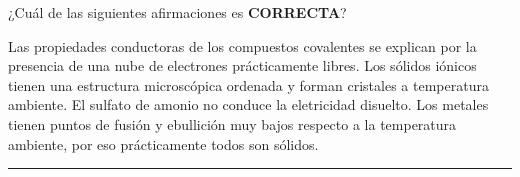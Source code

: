 \documentclass[a4paper,addpoints,14pt]{exam}
\newcommand*\chem[1]{\ensuremath{\mathrm{#1}}}
\newcommand{\halmos}{\vspace*{-4mm}
	
					\begin{flushright}
						\rule{1mm}{2.5mm} 
					\end{flushright}\vspace*{-4mm}
						
					  }
\renewcommand{\qed}{\halmos}
\begin{document}
	\begin{questions}
	
%			
		
	
	\begin{question}[1] ¿Cuál de las siguientes afirmaciones es \textbf{\small{CORRECTA}}?
		\begin{checkboxes}
			\choice Las propiedades conductoras de los compuestos covalentes se explican por la presencia de una nube de electrones prácticamente libres.
			\CorrectChoice Los sólidos iónicos tienen una estructura microscópica ordenada y forman cristales a temperatura ambiente.
			\choice  El sulfato de amonio no conduce la eletricidad disuelto.
			\choice Los metales tienen puntos de fusión y ebullición muy bajos respecto a la temperatura ambiente, por eso prácticamente todos son sólidos.
		\end{checkboxes}
	\end{question}
	\qed
	\vspace{-2ex}
	
		

	
%		
	

\end{questions}
\end{document}
